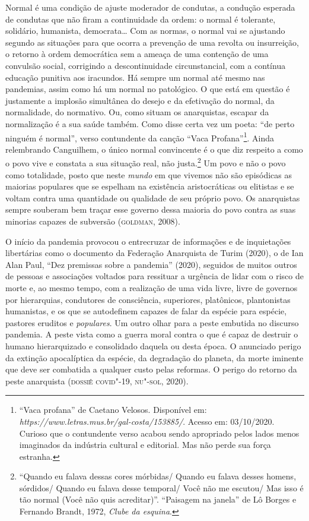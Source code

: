 Normal é uma condição de ajuste moderador de condutas, a condução
esperada de condutas que não firam a continuidade da ordem: o normal é
tolerante, solidário, humanista, democrata\ldots{} Com as normas, o normal
vai se ajustando segundo as situações para que ocorra a prevenção de uma
revolta ou insurreição, o retorno à ordem democrática sem a ameaça de
uma contenção de uma convulsão social, corrigindo a descontinuidade
circunstancial, com a contínua educação punitiva aos iracundos. Há
sempre um normal até mesmo nas pandemias, assim como há um normal no
patológico. O que está em questão é justamente a implosão simultânea do
desejo e da efetivação do normal, da normalidade, do normativo. Ou, como
situam os anarquistas, escapar da normalização é a sua saúde também.
Como disse certa vez um poeta: ``de perto ninguém é normal'', verso
contundente da canção ``Vaca Profana''\footnote{``Vaca profana'' de
  Caetano Velosos. Disponível em:
  \emph{https://www.letras.mus.br/gal-costa/153885/}. Acesso em:
  03/10/2020. Curioso que o contundente verso acabou sendo apropriado
  pelos lados menos imaginados da indústria cultural e editorial. Mas
  não perde sua força estranha.}. Ainda relembrando Canguilhem, o único
normal convincente é o que diz respeito a como o povo vive e constata a
sua situação real, não justa.\footnote{``Quando eu falava dessas cores
  mórbidas/ Quando eu falava desses homens, sórdidos/ Quando eu falava
  desse temporal/ Você não me escutou/ Mas isso é tão normal (Você não
  quis acreditar)''. ``Paisagem na janela'' de Lô Borges e Fernando
  Brandt, 1972, \emph{Clube da esquina}.} Um povo e não o povo como
totalidade, posto que neste \emph{mundo} em que vivemos não são
episódicas as maiorias populares que se espelham na existência
aristocráticas ou elitistas e se voltam contra uma quantidade ou
qualidade de seu próprio povo. Os anarquistas sempre souberam bem traçar
esse governo dessa maioria do povo contra as suas minorias capazes de
subversão (\textsc{goldman}, 2008).

O início da pandemia provocou o entrecruzar de informações e de
inquietações libertárias como o documento da Federação Anarquista de
Turim (2020), o de Ian Alan Paul, ``Dez premissas sobre a pandemia''
(2020), seguidos de muitos outros de pessoas e associações voltados para
ressituar a urgência de lidar com o risco de morte e, ao mesmo tempo,
com a realização de uma vida livre, livre de governos por hierarquias,
condutores de consciência, superiores, platônicos, plantonistas
humanistas, e os que se autodefinem capazes de falar da espécie para
espécie, pastores eruditos e \emph{populares}. Um outro olhar para a
peste embutida no discurso pandemia. A peste vista como a guerra moral
contra o que é capaz de destruir o humano hierarquizado e consolidado
daquela ou desta época. O anunciado perigo da extinção apocalíptica da
espécie, da degradação do planeta, da morte iminente que deve ser
combatida a qualquer custo pelas reformas. O perigo do retorno da peste
anarquista (\textsc{dossiê covid}"-19, \textsc{nu"-sol}, 2020).

